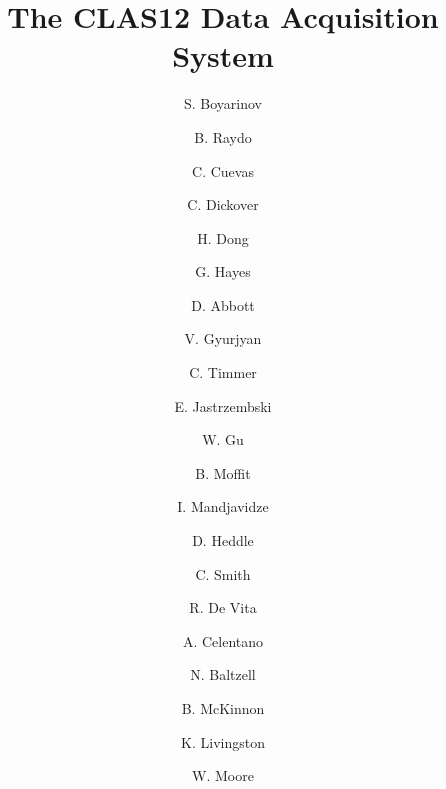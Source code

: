 \title{The CLAS12 Data Acquisition System}

\author[A]{S. Boyarinov}
\author[A]{B. Raydo}
\author[A]{C. Cuevas}
\author[A]{C. Dickover}
\author[A]{H. Dong}
\author[A]{G. Hayes}
\author[A]{D. Abbott}
\author[A]{V. Gyurjyan}
\author[A]{C. Timmer}
\author[A]{E. Jastrzembski}
\author[A]{W. Gu}
\author[A]{B. Moffit}
\author[B]{I. Mandjavidze}
\author[A]{D. Heddle}
\author[A]{C. Smith}
\author[C]{R. De Vita}
\author[C]{A. Celentano}
\author[A]{N. Baltzell}
\author[G]{B. McKinnon}
\author[G]{K. Livingston}
\author[A]{W. Moore}
\address[A]{Thomas Jefferson National Accelerator Facility, Newport News, VA 23606, USA}
\address[B]{Irfu, CEA, Universit\'{e} Paris-Saclay, 91191, Gif-sur-Yvette, France}
\address[C]{INFN, Sezione di Genova, Via Dodecaneso 33, I-16146 Genova, Italy}
\address[G]{University of Glasgow, Glasgow G12 8QQ, United Kingdom}
